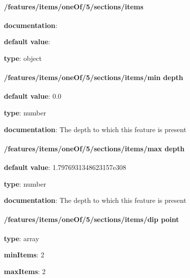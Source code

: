 \begin{itemized}
\paragraph{/features/items/oneOf/5/sections/items} \begin{itemized}
\item {\bf documentation}: 
\item {\bf default value}: 
\item {\bf type}: object
\end{itemized}\end{itemized}
\paragraph{/features/items/oneOf/5/sections/items/min depth} \begin{itemized}
\item {\bf default value}: 0.0
\item {\bf type}: number
\item {\bf documentation}: The depth to which this feature is present
\end{itemized}\paragraph{/features/items/oneOf/5/sections/items/max depth} \begin{itemized}
\item {\bf default value}: 1.7976931348623157e308
\item {\bf type}: number
\item {\bf documentation}: The depth to which this feature is present
\end{itemized}\paragraph{/features/items/oneOf/5/sections/items/dip point} \begin{itemized}
\item {\bf type}: array
\item {\bf minItems}: 2
\item {\bf maxItems}: 2

\end{itemized}
